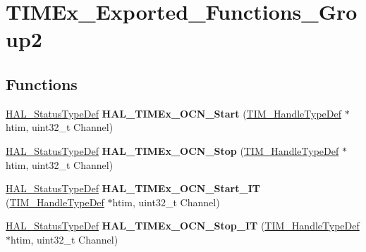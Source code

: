 \hypertarget{group___t_i_m_ex___exported___functions___group2}{}\section{T\+I\+M\+Ex\+\_\+\+Exported\+\_\+\+Functions\+\_\+\+Group2}
\label{group___t_i_m_ex___exported___functions___group2}
\subsection*{Functions}
\begin{DoxyCompactItemize}
\item 
\hyperlink{stm32f4xx__hal__def_8h_a63c0679d1cb8b8c684fbb0632743478f}{H\+A\+L\+\_\+\+Status\+Type\+Def} {\bfseries H\+A\+L\+\_\+\+T\+I\+M\+Ex\+\_\+\+O\+C\+N\+\_\+\+Start} (\hyperlink{struct_t_i_m___handle_type_def}{T\+I\+M\+\_\+\+Handle\+Type\+Def} $\ast$htim, uint32\+\_\+t Channel)\hypertarget{group___t_i_m_ex___exported___functions___group2_ga56d25f544564ef28a66dca7ec150de00}{}\label{group___t_i_m_ex___exported___functions___group2_ga56d25f544564ef28a66dca7ec150de00}

\item 
\hyperlink{stm32f4xx__hal__def_8h_a63c0679d1cb8b8c684fbb0632743478f}{H\+A\+L\+\_\+\+Status\+Type\+Def} {\bfseries H\+A\+L\+\_\+\+T\+I\+M\+Ex\+\_\+\+O\+C\+N\+\_\+\+Stop} (\hyperlink{struct_t_i_m___handle_type_def}{T\+I\+M\+\_\+\+Handle\+Type\+Def} $\ast$htim, uint32\+\_\+t Channel)\hypertarget{group___t_i_m_ex___exported___functions___group2_ga576cb1c3e40fc49555f232773cb2cdbc}{}\label{group___t_i_m_ex___exported___functions___group2_ga576cb1c3e40fc49555f232773cb2cdbc}

\item 
\hyperlink{stm32f4xx__hal__def_8h_a63c0679d1cb8b8c684fbb0632743478f}{H\+A\+L\+\_\+\+Status\+Type\+Def} {\bfseries H\+A\+L\+\_\+\+T\+I\+M\+Ex\+\_\+\+O\+C\+N\+\_\+\+Start\+\_\+\+IT} (\hyperlink{struct_t_i_m___handle_type_def}{T\+I\+M\+\_\+\+Handle\+Type\+Def} $\ast$htim, uint32\+\_\+t Channel)\hypertarget{group___t_i_m_ex___exported___functions___group2_ga2f4d7c285095d5293b81d2e11cd991af}{}\label{group___t_i_m_ex___exported___functions___group2_ga2f4d7c285095d5293b81d2e11cd991af}

\item 
\hyperlink{stm32f4xx__hal__def_8h_a63c0679d1cb8b8c684fbb0632743478f}{H\+A\+L\+\_\+\+Status\+Type\+Def} {\bfseries H\+A\+L\+\_\+\+T\+I\+M\+Ex\+\_\+\+O\+C\+N\+\_\+\+Stop\+\_\+\+IT} (\hyperlink{struct_t_i_m___handle_type_def}{T\+I\+M\+\_\+\+Handle\+Type\+Def} $\ast$htim, uint32\+\_\+t Channel)\hypertarget{group___t_i_m_ex___exported___functions___group2_gabe91877781dbd7fb9fdd63262e6ea10f}{}\label{group___t_i_m_ex___exported___functions___group2_gabe91877781dbd7fb9fdd63262e6ea10f}


\end{DoxyCompactItemize}
